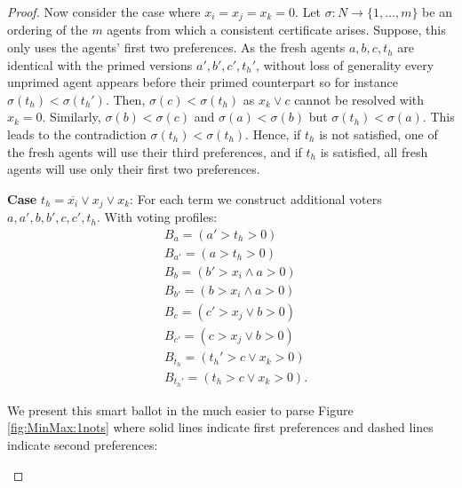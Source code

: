 \documentclass[11pt,a4paper, titlepage]{article}
\theoremstyle{definition}
\begin{document}
\begin{proof}
    Now consider the case where $x_i = x_j = x_k = 0$. Let $\sigma \colon N \longrightarrow \{1, \ldots, m\}$ be an ordering of the $m$ agents from which a consistent certificate arises. Suppose, this only uses the agents' first two preferences.
    As the fresh agents $a, b, c, t_h$ are identical with the primed versions $a', b', c', t_h'$, without loss of generality every unprimed agent appears before their primed counterpart so for instance $\sigma(t_h) < \sigma(t_h')$. 
    Then, $\sigma(c) < \sigma(t_h)$ as $x_k \lor c$ cannot be resolved with $x_k = 0$. 
    Similarly, $\sigma(b) < \sigma(c)$ and $ \sigma(a) < \sigma(b)$ but $\sigma(t_h) < \sigma(a)$. This leads to the contradiction $\sigma(t_h) < \sigma(t_h)$. 
    Hence, if $t_h$ is not satisfied, one of the fresh agents will use their third preferences, and if $t_h$ is satisfied, all fresh agents will use only their first two preferences.

    \textbf{Case} $t_h = \overline{x_i} \lor x_j \lor x_k$:
    For each term we construct additional voters $a, a', b, b', c, c', t_h$. With voting profiles: 
    \begin{align*}
        &B_a = (a' > t_h > 0) \\
        &B_{a'} = (a > t_h > 0) \\
        &B_{b} = (b' > x_i \land a > 0) \\
        &B_{b'} = (b > x_i \land a > 0) \\
        &B_{c} = (c' > x_j \lor b > 0) \\
        &B_{c'} = (c > x_j \lor b > 0) \\
        &B_{t_h} = (t_h' > c \lor x_k > 0) \\
        &B_{t_h'} = (t_h > c \lor x_k > 0).
    \end{align*}

    We present this smart ballot in the much easier to parse Figure \ref{fig:MinMax:1nots} where solid lines indicate first preferences and dashed lines indicate second preferences:
    \begin{figure}
        \centering

\end{figure}
\end{proof}
\end{document}
